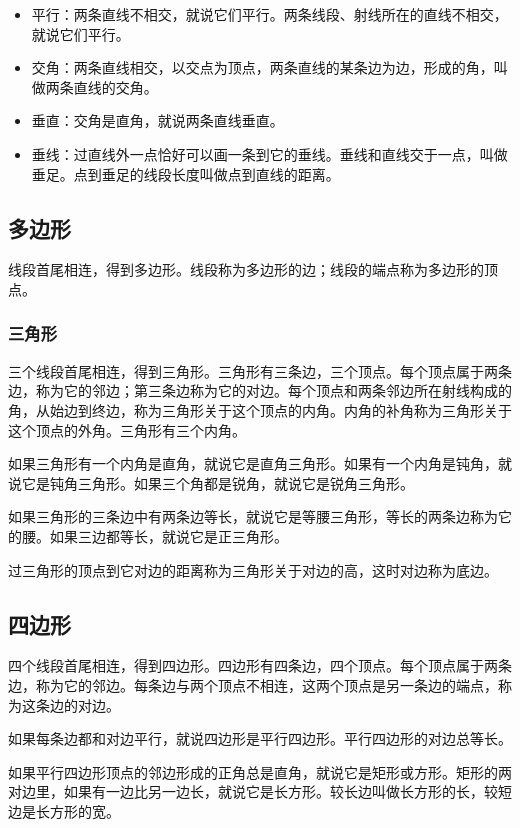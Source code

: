 \documentclass[12pt,UTF8]{ctexbook}
\begin{document}
\begin{itemize}
\item 平行：两条直线不相交，就说它们平行。两条线段、射线所在的直线不相交，就说它们平行。
\item 交角：两条直线相交，以交点为顶点，两条直线的某条边为边，形成的角，叫做两条直线的交角。
\item 垂直：交角是直角，就说两条直线垂直。
\item 垂线：过直线外一点恰好可以画一条到它的垂线。垂线和直线交于一点，叫做垂足。点到垂足的线段长度叫做点到直线的距离。
\end{itemize}

\subsection{多边形}

线段首尾相连，得到多边形。线段称为多边形的边；线段的端点称为多边形的顶点。

\subsubsection{三角形}
三个线段首尾相连，得到三角形。三角形有三条边，三个顶点。每个顶点属于两条边，称为它的邻边；第三条边称为它的对边。每个顶点和两条邻边所在射线构成的角，从始边到终边，称为三角形关于这个顶点的内角。内角的补角称为三角形关于这个顶点的外角。三角形有三个内角。

如果三角形有一个内角是直角，就说它是直角三角形。如果有一个内角是钝角，就说它是钝角三角形。如果三个角都是锐角，就说它是锐角三角形。

如果三角形的三条边中有两条边等长，就说它是等腰三角形，等长的两条边称为它的腰。如果三边都等长，就说它是正三角形。

过三角形的顶点到它对边的距离称为三角形关于对边的高，这时对边称为底边。

\subsection{四边形}
四个线段首尾相连，得到四边形。四边形有四条边，四个顶点。每个顶点属于两条边，称为它的邻边。每条边与两个顶点不相连，这两个顶点是另一条边的端点，称为这条边的对边。

如果每条边都和对边平行，就说四边形是平行四边形。平行四边形的对边总等长。

如果平行四边形顶点的邻边形成的正角总是直角，就说它是矩形或方形。矩形的两对边里，如果有一边比另一边长，就说它是长方形。较长边叫做长方形的长，较短边是长方形的宽。
\end{document}
